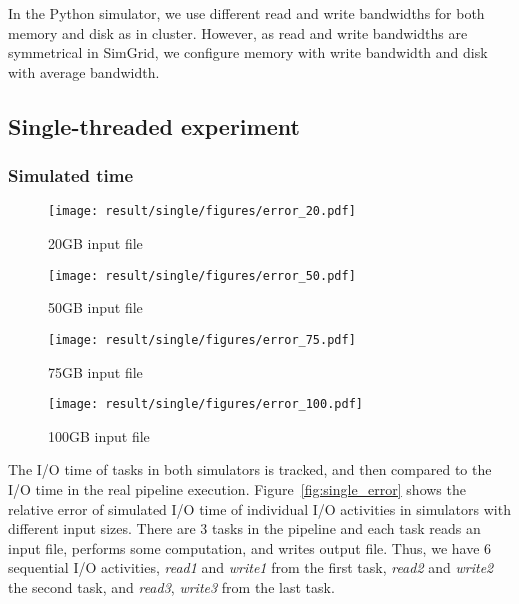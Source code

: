 \documentclass[conference]{IEEEtran}
\begin{document}
		In the Python simulator, we use different read and write bandwidths for both 
		memory and disk as in cluster. However, as read and write bandwidths are 
		symmetrical in SimGrid, we configure memory with write bandwidth 
		and disk with average bandwidth. 
		
		\subsection{Single-threaded experiment}

		\subsubsection{Simulated time}
		
			\begin{figure*}
			\begin{subfigure}{\columnwidth}
				\centering
   				\texttt{[image: result/single/figures/error\_20.pdf]}
   				\caption{20GB input file}	\label{fig:single_error_20}
			\end{subfigure}	
			\begin{subfigure}{\columnwidth}
				\centering
   				\texttt{[image: result/single/figures/error\_50.pdf]}
   				\caption{50GB input file}	\label{fig:single_error_50}
			\end{subfigure}	
			\begin{subfigure}{\columnwidth}
				\centering
   				\texttt{[image: result/single/figures/error\_75.pdf]}
   				\caption{75GB input file}	\label{fig:single_error_75}
			\end{subfigure}	
			\begin{subfigure}{\columnwidth}
				\centering
   				\texttt{[image: result/single/figures/error\_100.pdf]}
   				\caption{100GB input file}	\label{fig:single_error_100}
			\end{subfigure}	
			\caption{Relative error of individual simulated tasks}
			\label{fig:single_error}
			\end{figure*}
			
			The I/O time of tasks in both simulators is tracked, and then compared 
			to the I/O time in the real pipeline execution. 
			Figure~\ref{fig:single_error} shows the relative error of simulated I/O time of 
			individual I/O activities in simulators with different input sizes. 
			There are 3 tasks in the pipeline and each task reads an input file, 
			performs some computation, and writes output file. 
			Thus, we have 6 sequential I/O activities, \textit{read1} and \textit{write1} 
			from the first task, \textit{read2} and \textit{write2} the second task, 
			and \textit{read3}, \textit{write3} from the last task.
			
\end{document}
